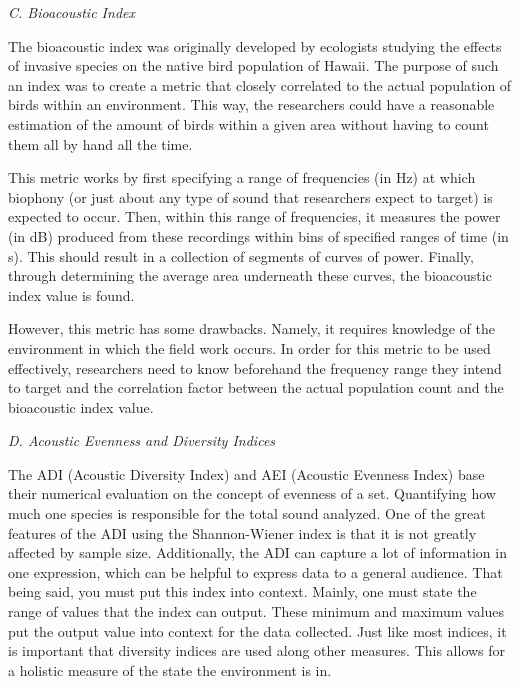 \begin{flushleft}
\noindent\textit{C. Bioacoustic Index}\par
The bioacoustic index was originally developed by ecologists studying the effects of invasive species on the native bird population of Hawaii.\cite{boelman} The purpose of such an index was to create a metric that closely correlated to the actual population of birds within an environment. This way, the researchers could have a reasonable estimation of the amount of birds within a given area without having to count them all by hand all the time.\par
This metric works by first specifying a range of frequencies (in Hz) at which biophony (or just about any type of sound that researchers expect to target) is expected to occur. Then, within this range of frequencies, it measures the power (in dB) produced from these recordings within bins of specified ranges of time (in s). This should result in a collection of segments of curves of power. Finally, through determining the average area underneath these curves, the bioacoustic index value is found.\par
However, this metric has some drawbacks. Namely, it requires knowledge of the environment in which the field work occurs. In order for this metric to be used effectively, researchers need to know beforehand the frequency range they intend to target and the correlation factor between the actual population count and the bioacoustic index value.\par

\noindent\textit{D. Acoustic Evenness and Diversity Indices}\par
  The ADI (Acoustic Diversity Index) and AEI (Acoustic Evenness Index) base their numerical evaluation on the concept of evenness of a set. Quantifying how much one species is responsible for the total sound analyzed. One of the great features of the ADI using the Shannon-Wiener index is that it is not greatly affected by sample size. Additionally, the ADI can capture a lot of information in one expression, which can be helpful to express data to a general audience. That being said, you must put this index into context. Mainly, one must state the range of values that the index can output. These minimum and maximum values put the output value into context for the data collected. Just like most indices, it is important that diversity indices are used along other measures. This allows for a holistic measure of the state the environment is in.\cite{shannonWiener}\par

\end{flushleft}
